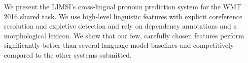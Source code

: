 We present the LIMSI's cross-lingual pronoun prediction system for the WMT 2016 shared task. We use high-level linguistic features with explicit coreference resolution and expletive detection and rely on dependency annotations and a morphological lexicon. We show that our few, carefully chosen features perform significantly better than several language model baselines and competitively compared to the other systems submitted.
